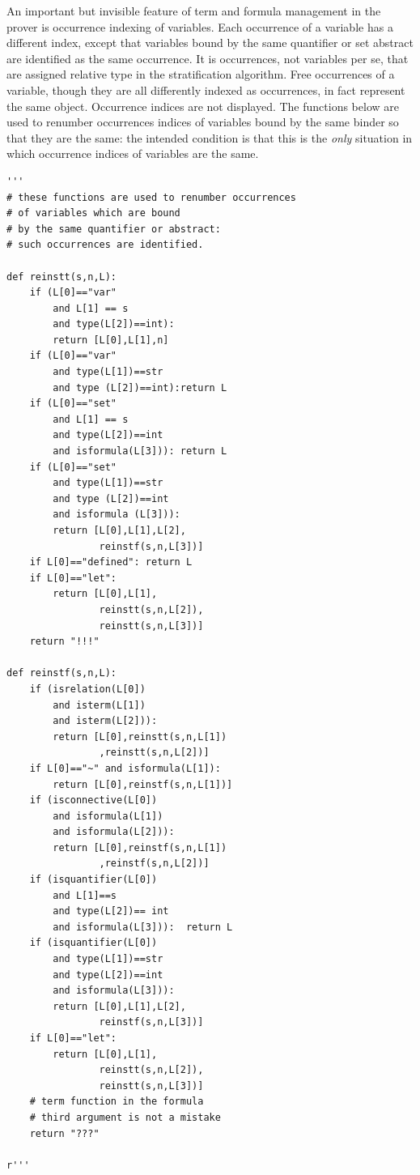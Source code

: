 \documentclass{article}
\begin{document}
An important but invisible feature of term and formula management in the prover is occurrence indexing of variables.
Each occurrence of a variable has a different index, except that variables bound by the same quantifier or set abstract
are identified as the same occurrence.  It is occurrences, not variables per se, that are assigned relative type in the stratification algorithm.   Free occurrences of a variable, though they are all differently indexed as occurrences,
in fact represent the same object.  Occurrence indices are not displayed.  The functions below are used to renumber
occurrences indices of variables bound by the same binder so that they are the same:  the intended condition is that this is the {\em only\/} situation in which occurrence indices of variables are the same.

\begin{verbatim}
'''
# these functions are used to renumber occurrences
# of variables which are bound
# by the same quantifier or abstract:
# such occurrences are identified.

def reinstt(s,n,L):
    if (L[0]=="var"
        and L[1] == s
        and type(L[2])==int):
        return [L[0],L[1],n]
    if (L[0]=="var"
        and type(L[1])==str
        and type (L[2])==int):return L
    if (L[0]=="set"
        and L[1] == s
        and type(L[2])==int
        and isformula(L[3])): return L
    if (L[0]=="set"
        and type(L[1])==str
        and type (L[2])==int
        and isformula (L[3])):
        return [L[0],L[1],L[2],
                reinstf(s,n,L[3])]
    if L[0]=="defined": return L
    if L[0]=="let":
        return [L[0],L[1],
                reinstt(s,n,L[2]),
                reinstt(s,n,L[3])]
    return "!!!"

def reinstf(s,n,L):
    if (isrelation(L[0])
        and isterm(L[1])
        and isterm(L[2])):
        return [L[0],reinstt(s,n,L[1])
                ,reinstt(s,n,L[2])]
    if L[0]=="~" and isformula(L[1]):
        return [L[0],reinstf(s,n,L[1])]
    if (isconnective(L[0])
        and isformula(L[1])
        and isformula(L[2])):
        return [L[0],reinstf(s,n,L[1])
                ,reinstf(s,n,L[2])]
    if (isquantifier(L[0])
        and L[1]==s
        and type(L[2])== int
        and isformula(L[3])):  return L
    if (isquantifier(L[0])
        and type(L[1])==str
        and type(L[2])==int
        and isformula(L[3])):
        return [L[0],L[1],L[2],
                reinstf(s,n,L[3])]
    if L[0]=="let":
        return [L[0],L[1],
                reinstt(s,n,L[2]),
                reinstt(s,n,L[3])]
    # term function in the formula
    # third argument is not a mistake
    return "???"

r'''
\end{verbatim}
\end{document}
